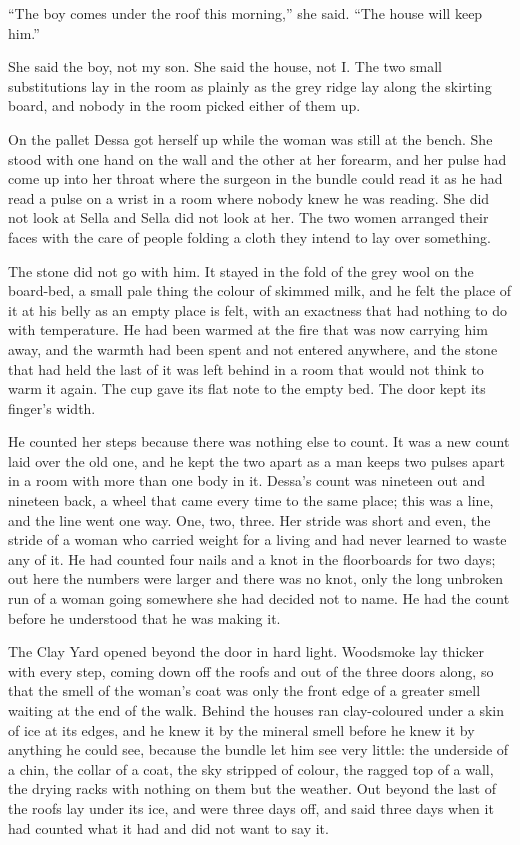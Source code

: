 “The boy comes under the roof this morning,” she said. “The house will keep him.”

She said the boy, not my son. She said the house, not I. The two small substitutions lay in the room as plainly as the grey ridge lay along the skirting board, and nobody in the room picked either of them up.

On the pallet Dessa got herself up while the woman was still at the bench. She stood with one hand on the wall and the other at her forearm, and her pulse had come up into her throat where the surgeon in the bundle could read it as he had read a pulse on a wrist in a room where nobody knew he was reading. She did not look at Sella and Sella did not look at her. The two women arranged their faces with the care of people folding a cloth they intend to lay over something.

The stone did not go with him. It stayed in the fold of the grey wool on the board-bed, a small pale thing the colour of skimmed milk, and he felt the place of it at his belly as an empty place is felt, with an exactness that had nothing to do with temperature. He had been warmed at the fire that was now carrying him away, and the warmth had been spent and not entered anywhere, and the stone that had held the last of it was left behind in a room that would not think to warm it again. The cup gave its flat note to the empty bed. The door kept its finger's width.

\scenebreak

He counted her steps because there was nothing else to count. It was a new count laid over the old one, and he kept the two apart as a man keeps two pulses apart in a room with more than one body in it. Dessa's count was nineteen out and nineteen back, a wheel that came every time to the same place; this was a line, and the line went one way. One, two, three. Her stride was short and even, the stride of a woman who carried weight for a living and had never learned to waste any of it. He had counted four nails and a knot in the floorboards for two days; out here the numbers were larger and there was no knot, only the long unbroken run of a woman going somewhere she had decided not to name. He had the count before he understood that he was making it.

The Clay Yard opened beyond the door in hard light. Woodsmoke lay thicker with every step, coming down off the roofs and out of the  three doors along, so that the smell of the woman's coat was only the front edge of a greater smell waiting at the end of the walk. Behind the houses  ran clay-coloured under a skin of ice at its edges, and he knew it by the mineral smell before he knew it by anything he could see, because the bundle let him see very little: the underside of a chin, the collar of a coat, the sky stripped of colour, the ragged top of a wall, the drying racks with nothing on them but the weather. Out beyond the last of the roofs  lay under its ice, and  were three days off, and  said three days when it had counted what it had and did not want to say it.

